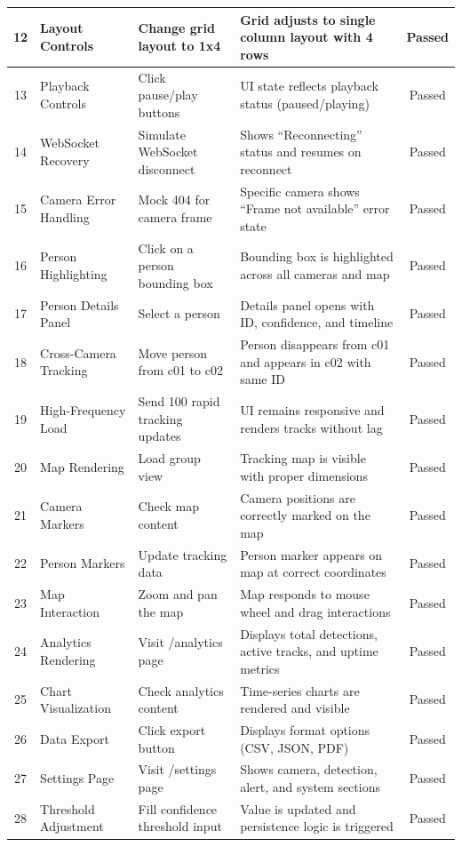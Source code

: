 \begin{longtable}{|c|p{4cm}|p{4cm}|p{4cm}|c|}
12 & Layout Controls & Change grid layout to 1x4 & Grid adjusts to single column layout with 4 rows & Passed \\ \hline
13 & Playback Controls & Click pause/play buttons & UI state reflects playback status (paused/playing) & Passed \\ \hline
14 & WebSocket Recovery & Simulate WebSocket disconnect & Shows ``Reconnecting'' status and resumes on reconnect & Passed \\ \hline
15 & Camera Error Handling & Mock 404 for camera frame & Specific camera shows ``Frame not available'' error state & Passed \\ \hline
16 & Person Highlighting & Click on a person bounding box & Bounding box is highlighted across all cameras and map & Passed \\ \hline
17 & Person Details Panel & Select a person & Details panel opens with ID, confidence, and timeline & Passed \\ \hline
18 & Cross-Camera Tracking & Move person from c01 to c02 & Person disappears from c01 and appears in c02 with same ID & Passed \\ \hline
19 & High-Frequency Load & Send 100 rapid tracking updates & UI remains responsive and renders tracks without lag & Passed \\ \hline
20 & Map Rendering & Load group view & Tracking map is visible with proper dimensions & Passed \\ \hline
21 & Camera Markers & Check map content & Camera positions are correctly marked on the map & Passed \\ \hline
22 & Person Markers & Update tracking data & Person marker appears on map at correct coordinates & Passed \\ \hline
23 & Map Interaction & Zoom and pan the map & Map responds to mouse wheel and drag interactions & Passed \\ \hline
24 & Analytics Rendering & Visit /analytics page & Displays total detections, active tracks, and uptime metrics & Passed \\ \hline
25 & Chart Visualization & Check analytics content & Time-series charts are rendered and visible & Passed \\ \hline
26 & Data Export & Click export button & Displays format options (CSV, JSON, PDF) & Passed \\ \hline
27 & Settings Page & Visit /settings page & Shows camera, detection, alert, and system sections & Passed \\ \hline
28 & Threshold Adjustment & Fill confidence threshold input & Value is updated and persistence logic is triggered & Passed \\ \hline

\end{longtable}
